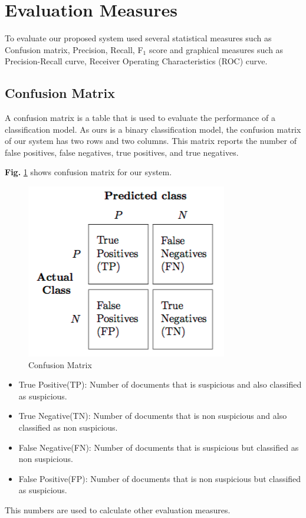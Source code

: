 \section{\textbf{Evaluation Measures}}
To evaluate our proposed system used several statistical measures such as Confusion matrix, Precision, Recall, F$_1$ score and graphical measures such as Precision-Recall curve, Receiver Operating Characteristics (ROC) curve.
\subsection{\textbf{Confusion Matrix}}
A confusion matrix is a table that is used to evaluate the performance of a classification model. As ours is a binary classification model, the confusion matrix of our system has two rows and two columns. This matrix reports the number of false positives, false negatives, true positives, and true negatives.
\par
\vspace{0.3cm}
\noindent
\textbf{Fig.} \ref{fig:CM} shows confusion matrix for our system.\clearpage
\begin{figure}[h!]
    \centering
    \includegraphics[scale=0.50]{Figures/confusion_matrix_1.png}
    \caption{Confusion Matrix}
    \label{fig:CM}
\end{figure}
\begin{itemize}
    \item True Positive(TP): Number of documents that is suspicious and also classified as suspicious.\vspace{0.2cm}
    \item True Negative(TN): Number of documents that is non suspicious and also classified as non suspicious.\vspace{0.2cm}
    \item False Negative(FN): Number of documents that is suspicious but classified as non suspicious.\vspace{0.2cm}
    \item False Positive(FP): Number of documents that is non suspicious but classified as suspicious. 
\end{itemize}
\noindent
This numbers are used to calculate other evaluation measures.

